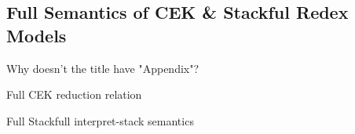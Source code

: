 \begin{appendices}
\chapter[\texorpdfstring{Full Semantics of CEK \& Stackful Redex Models}
                          {Appendix D}]{Full Semantics of CEK \& Stackful Redex Models}
\label{appendix:cek-stackful-redex}

    \begin{todo}
        Why doesn't the title have "Appendix"?
    \end{todo}

    \begin{figure-here}
        Full CEK reduction relation
    \end{figure-here}

    \begin{figure-here}
        Full Stackfull interpret-stack semantics
    \end{figure-here}


\end{appendices}